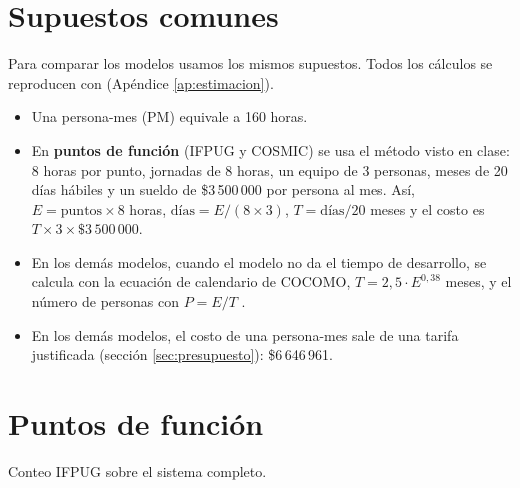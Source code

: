 \section{Supuestos comunes}

Para comparar los modelos usamos los mismos supuestos. Todos los cálculos se reproducen con  (Apéndice \ref{ap:estimacion}).

\begin{itemize}
  \item Una persona-mes (PM) equivale a 160 horas.
  \item En \textbf{puntos de función} (IFPUG y COSMIC) se usa el método visto en clase: 8 horas por punto, jornadas de 8 horas, un equipo de 3 personas, meses de 20 días hábiles y un sueldo de \$3\,500\,000 por persona al mes. Así, $E = \text{puntos} \times 8$ horas, $\text{días} = E / (8 \times 3)$, $T = \text{días} / 20$ meses y el costo es $T \times 3 \times \$3\,500\,000$.
  \item En los demás modelos, cuando el modelo no da el tiempo de desarrollo, se calcula con la ecuación de calendario de COCOMO, $T = 2{,}5 \cdot E^{0{,}38}$ meses, y el número de personas con $P = E/T$ \parencite{boehm2000}.
  \item En los demás modelos, el costo de una persona-mes sale de una tarifa justificada (sección \ref{sec:presupuesto}): \$6\,646\,961.
\end{itemize}

\section{Puntos de función}

Conteo IFPUG \parencite{albrecht1979,ifpug2010} sobre el sistema completo.

